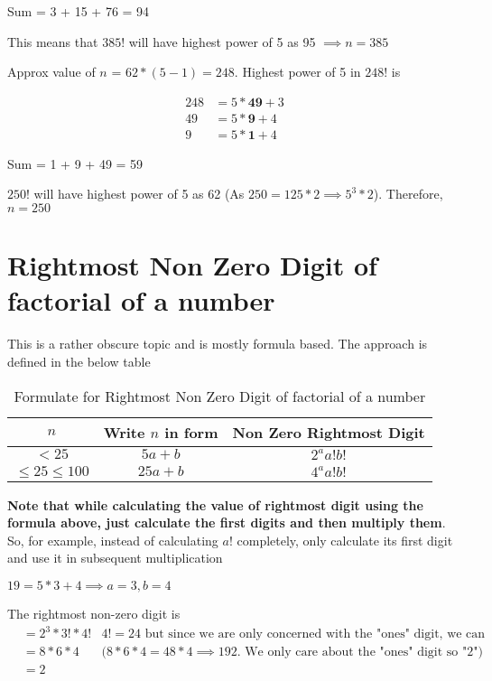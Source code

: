Sum = 3 + 15 + 76 = 94

This means that $385!$ will have highest power of 5 as 95 $\implies n = 385$


Approx value of $n$ = $62 * (5-1) = 248$. Highest power of 5 in $248!$ is 

\begin{align*}
    248 &= 5 * \textbf{49} + 3 \\
    49 &= 5 *  \textbf{9} + 4 \\
    9 &= 5 *   \textbf{1} + 4
\end{align*}

Sum = 1 + 9 + 49 = 59

$250!$ will have highest power of 5 as 62 (As $250 = 125 * 2 \implies 5^3 * 2$). Therefore, $n = 250$

\section{Rightmost Non Zero Digit of factorial of a number}

This is a rather obscure topic and is mostly formula based. The approach is defined in the below table

\begin{table}[ht!]
    \centering
    \begin{tabular}{|| c | c | c ||}
         \hline
         $n$ & Write $n$ in form & Non Zero Rightmost Digit  \\
         \hline
         $< 25$ & $5a + b$ & $2^a a! b!$ \\
         $\leq 25 \leq 100$ & $25a + b$ & $4^a a! b!$ \\
         \hline
    \end{tabular}
    \caption{Formulate for Rightmost Non Zero Digit of factorial of a number}
\end{table}

\textbf{Note that while calculating the value of rightmost digit using the formula above, just calculate the first digits and then multiply them}. So, for example, instead of calculating $a!$ completely, only calculate its first digit and use it in subsequent multiplication


$19 = 5*3 + 4 \implies a=3,b=4$

The rightmost non-zero digit is 
\begin{align*}
    &= 2^3 * 3! * 4! &\text{$4! = 24$ but since we are only concerned with the "ones" digit, we can use 4} \\
    &= 8 * 6 * 4 &\text{($8 * 6 * 4 = 48 * 4 \implies 192$. We only care about the "ones" digit so "2")} \\
    &= 2 \\ 
\end{align*}

